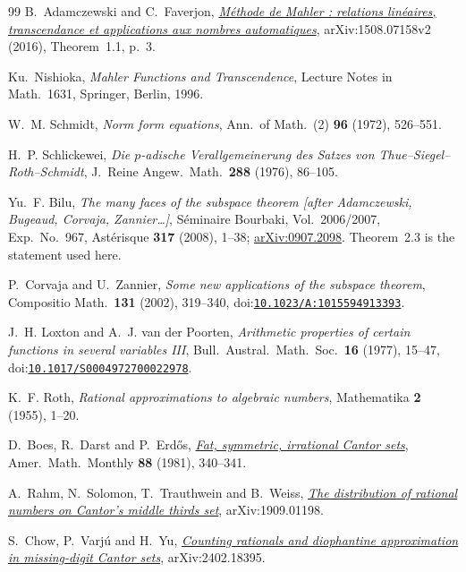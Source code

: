 \documentclass[11pt]{article}
\begin{document}
\begin{thebibliography}{99}
 B.~Adamczewski and C.~Faverjon,
  \href{https://arxiv.org/abs/1508.07158v2}{\emph{M\'ethode de Mahler : relations
  lin\'eaires, transcendance et applications aux nombres automatiques}},
  arXiv:1508.07158v2 (2016), Theorem~1.1, p.~3.

 Ku.~Nishioka, \emph{Mahler Functions and Transcendence},
  Lecture Notes in Math.\ 1631, Springer, Berlin, 1996.

 W.~M. Schmidt, \emph{Norm form equations}, Ann.\ of
  Math.\ (2) \textbf{96} (1972), 526--551.

 H.~P. Schlickewei, \emph{Die $p$-adische
  Verallgemeinerung des Satzes von Thue--Siegel--Roth--Schmidt}, J.\ Reine
  Angew.\ Math.\ \textbf{288} (1976), 86--105.

 Yu.~F. Bilu, \emph{The many faces of the subspace theorem
  [after Adamczewski, Bugeaud, Corvaja, Zannier\dots]}, S\'eminaire Bourbaki,
  Vol.\ 2006/2007, Exp.\ No.~967, Ast\'erisque \textbf{317} (2008), 1--38;
  \href{https://arxiv.org/abs/0907.2098}{arXiv:0907.2098}. Theorem~2.3 is the
  statement used here.

 P.~Corvaja and U.~Zannier, \emph{Some new
  applications of the subspace theorem}, Compositio Math.\ \textbf{131}
  (2002), 319--340,
  doi:\href{https://doi.org/10.1023/A:1015594913393}{\nolinkurl{10.1023/A:1015594913393}}.

 J.~H. Loxton and A.~J. van der Poorten,
  \emph{Arithmetic properties of certain functions in several variables III},
  Bull.\ Austral.\ Math.\ Soc.\ \textbf{16} (1977), 15--47,
  doi:\href{https://doi.org/10.1017/S0004972700022978}{\nolinkurl{10.1017/S0004972700022978}}.

 K.~F. Roth, \emph{Rational approximations to algebraic
  numbers}, Mathematika \textbf{2} (1955), 1--20.

 D.~Boes, R.~Darst and P.~Erd\H{o}s,
  \href{https://www.tandfonline.com/doi/abs/10.1080/00029890.1981.11995266}{\emph{Fat,
  symmetric, irrational Cantor sets}}, Amer.\ Math.\ Monthly \textbf{88} (1981),
  340--341.

 A.~Rahm, N.~Solomon, T.~Trauthwein and B.~Weiss,
  \href{https://arxiv.org/abs/1909.01198}{\emph{The distribution of rational
  numbers on Cantor's middle thirds set}}, arXiv:1909.01198.

 S.~Chow, P.~Varj\'u and H.~Yu,
  \href{https://arxiv.org/abs/2402.18395}{\emph{Counting rationals and
  diophantine approximation in missing-digit Cantor sets}}, arXiv:2402.18395.


\end{thebibliography}
\end{document}
